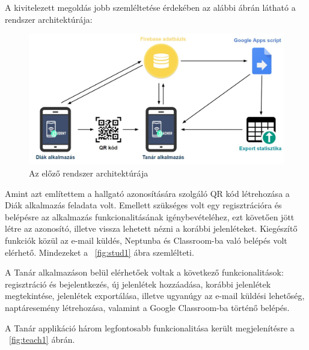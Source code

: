 A kivitelezett megoldás jobb szemléltetése érdekében az alábbi ábrán látható a rendszer architektúrája:


\begin{figure}
	\includegraphics[width=\textwidth]{figures/architecture2.jpg}
	\caption{Az előző rendszer architektúrája}
\end{figure}

\newpage


Amint azt említettem a hallgató azonosítására szolgáló QR kód létrehozása a Diák alkalmazás feladata volt. Emellett szükséges volt egy regisztrációra és belépésre az alkalmazás funkcionalitásának igénybevételéhez, ezt követően jött létre az azonosító, illetve vissza lehetett nézni a korábbi jelenléteket. Kiegészítő funkciók közül az e-mail küldés, Neptunba és Classroom-ba való belépés volt elérhető. Mindezeket a ~\ref{fig:stud1} ábra szemlélteti.

A Tanár alkalmazáson belül elérhetőek voltak a következő funkcionalitások: regisztráció és bejelentkezés, új jelenlétek hozzáadása, korábbi jelenlétek megtekintése, jelenlétek exportálása, illetve ugyanúgy az e-mail küldési lehetőség, naptáresemény létrehozása, valamint a Google Classroom-ba történő belépés.

A Tanár applikáció három legfontosabb funkcionalitása került megjelenítésre a ~\ref{fig:teach1} ábrán.



